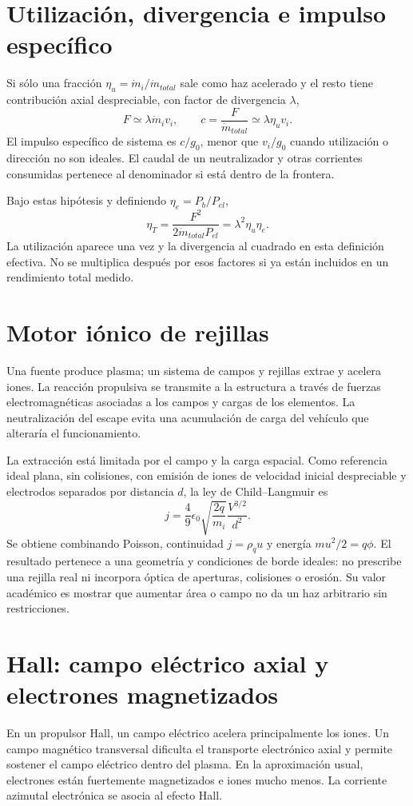 \section{Utilización, divergencia e impulso específico}
Si sólo una fracción $\eta_u=\dot m_i/\dot m_{total}$ sale como haz acelerado y el resto tiene contribución axial despreciable, con factor de divergencia $\lambda$,
\[
 F\simeq\lambda\dot m_iv_i,
 \qquad c=\frac{F}{\dot m_{total}}\simeq\lambda\eta_uv_i.
\]
El impulso específico de sistema es $c/g_0$, menor que $v_i/g_0$ cuando utilización o dirección no son ideales. El caudal de un neutralizador y otras corrientes consumidas pertenece al denominador si está dentro de la frontera.

Bajo estas hipótesis y definiendo $\eta_e=P_b/P_{el}$,
\[
 \eta_T=\frac{F^2}{2\dot m_{total}P_{el}}
 =\lambda^2\eta_u\eta_e.
\]
La utilización aparece una vez y la divergencia al cuadrado en esta definición efectiva. No se multiplica después por esos factores si ya están incluidos en un rendimiento total medido.\cite{JPL-EP}
\section{Motor iónico de rejillas}
Una fuente produce plasma; un sistema de campos y rejillas extrae y acelera iones. La reacción propulsiva se transmite a la estructura a través de fuerzas electromagnéticas asociadas a los campos y cargas de los elementos. La neutralización del escape evita una acumulación de carga del vehículo que alteraría el funcionamiento.

La extracción está limitada por el campo y la carga espacial. Como referencia ideal plana, sin colisiones, con emisión de iones de velocidad inicial despreciable y electrodos separados por distancia $d$, la ley de Child--Langmuir es
\begin{equation}\label{eq:child}
 j=\frac49\epsilon_0\sqrt{\frac{2q}{m_i}}\frac{V^{3/2}}{d^2}.
\end{equation}
Se obtiene combinando Poisson, continuidad $j=\rho_qu$ y energía $mu^2/2=q\phi$. El resultado pertenece a una geometría y condiciones de borde ideales: no prescribe una rejilla real ni incorpora óptica de aperturas, colisiones o erosión. Su valor académico es mostrar que aumentar área o campo no da un haz arbitrario sin restricciones.\cite{JPL-EP}
\section{Hall: campo eléctrico axial y electrones magnetizados}
En un propulsor Hall, un campo eléctrico acelera principalmente los iones. Un campo magnético transversal dificulta el transporte electrónico axial y permite sostener el campo eléctrico dentro del plasma. En la aproximación usual, electrones están fuertemente magnetizados e iones mucho menos. La corriente azimutal electrónica se asocia al efecto Hall.

